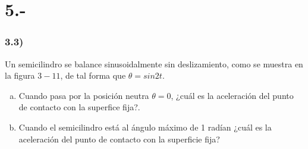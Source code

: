 \documentclass{article}
\begin{document}
\section*{5.-}
\subsubsection*{3.3)}
Un semicilindro se balance sinusoidalmente sin deslizamiento, como se muestra en la figura 
$3-11$, de tal forma que $\theta = sin2t$. 
\begin{enumerate}[a)]
    \item Cuando pasa por la posición neutra $\theta=0$, ¿cuál es la aceleración del punto
    de contacto con la superfice fija?. 
    \item Cuando el semicilindro está al ángulo máximo de 1 radían ¿cuál es la aceleración 
    del punto de contacto con la superficie fija?
\end{enumerate}
\end{document}
